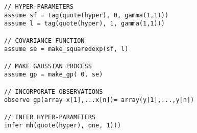 \begin{minipage}{\linewidth}
\small
\belowcaptionskip=-10pt
\begin{lstlisting}[frame=single,mathescape,label=alg:gpNeal,basicstyle=\selectfont\ttfamily,numbers=none]
// HYPER-PARAMETERS
assume sf = tag(quote(hyper), 0, gamma(1,1)))
assume l = tag(quote(hyper), 1, gamma(1,1)))

// COVARIANCE FUNCTION
assume se = make_squaredexp(sf, l)

// MAKE GAUSSIAN PROCESS
assume gp = make_gp( 0, se)

// INCORPORATE OBSERVATIONS
observe gp(array x[1],...x[n])= array(y[1],...,y[n])

// INFER HYPER-PARAMETERS
infer mh(quote(hyper), one, 1)))
\end{lstlisting}
\end{minipage}
